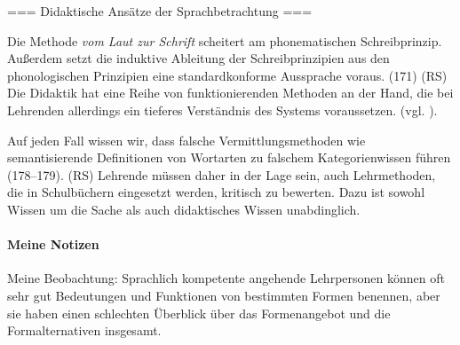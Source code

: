 === Didaktische Ansätze der Sprachbetrachtung ===

Die Methode \textit{vom Laut zur Schrift} scheitert am phonematischen Schreibprinzip.
Außerdem setzt die induktive Ableitung der Schreibprinzipien aus den phonologischen Prinzipien eine standardkonforme Aussprache voraus. (171)
(RS) Die Didaktik hat eine Reihe von funktionierenden Methoden an der Hand, die bei Lehrenden allerdings ein tieferes Verständnis des Systems voraussetzen. (vgl. \citealt[Abschnit~2.1]{Bredel2013}).

Auf jeden Fall wissen wir, dass falsche Vermittlungsmethoden wie semantisierende Definitionen von Wortarten zu falschem Kategorienwissen führen (178--179). (RS) Lehrende müssen daher in der Lage sein, auch Lehrmethoden, die in Schulbüchern eingesetzt werden, kritisch zu bewerten. Dazu ist sowohl Wissen um die Sache als auch didaktisches Wissen unabdinglich.




\paragraph{Meine Notizen}

Meine Beobachtung: Sprachlich kompetente angehende Lehrpersonen können oft sehr gut Bedeutungen und Funktionen von bestimmten Formen benennen, aber sie haben einen schlechten Überblick über das Formenangebot und die Formalternativen insgesamt.


















